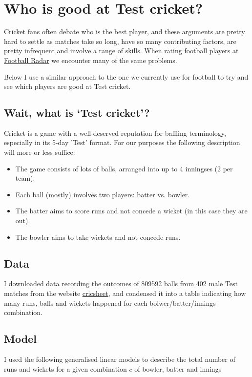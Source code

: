 \documentclass[11pt]{article}
\date{}
\title{}
\begin{document}
\section*{Who is good at Test cricket?}
\label{sec:orgdb14a05}
Cricket fans often debate who is the best player, and these arguments
are pretty hard to settle as matches take so long, have so many
contributing factors, are pretty infrequent and involve a range of
skills. When rating football players at \href{http:www.footballradar.com}{Football Radar} we encounter
many of the same problems.

Below I use a similar approach to the one we currently use for
football to try and see which players are good at Test cricket.

\subsection*{Wait, what is `Test cricket'?}
\label{sec:orgc29a04f}
Cricket is a game with a well-deserved reputation for baffling
terminology, especially in its 5-day 'Test' format. For our purposes
the following description will more or less suffice:

\begin{itemize}
\item The game consists of lots of balls, arranged into up to 4 inningses
(2 per team).
\item Each ball (mostly) involves two players: batter vs. bowler.
\item The batter aims to score runs and not concede a wicket (in this case
they are out).
\item The bowler aims to take wickets and not concede runs.
\end{itemize}

\subsection*{Data}
\label{sec:org9a6a10b}
I downloaded data recording the outcomes of 809592 balls from 402 male Test
matches from the website \href{https://cricsheet.org/downloads/\#experimental}{cricsheet}, and condensed it into a table indicating how
many runs, balls and wickets happened for each bolwer/batter/innings
combination.

\subsection*{Model}
\label{sec:orgc35be06}
I used the following generalised linear models to describe the total number of
runs and wickets for a given combination \(c\) of bowler, batter and innings
\end{document}

